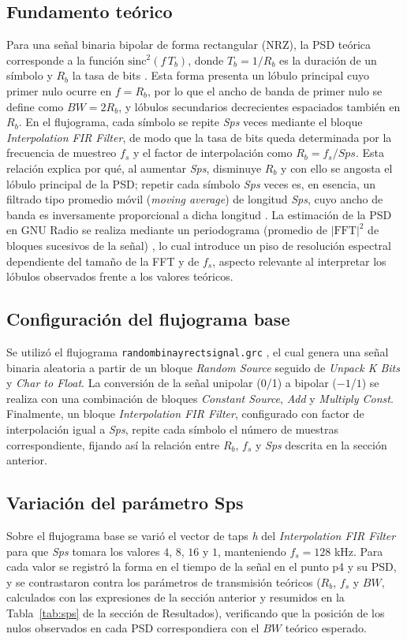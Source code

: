 \documentclass[twocolumn]{IEEEtran}
\begin{document}
\subsection{Fundamento teórico}
Para una señal binaria bipolar de forma rectangular (NRZ), la PSD teórica corresponde a la función $\text{sinc}^2(f \, T_b)$, donde $T_b = 1/R_b$ es la duración de un símbolo y $R_b$ la tasa de bits \cite{ortega2019comunicaciones}. Esta forma presenta un lóbulo principal cuyo primer nulo ocurre en $f = R_b$, por lo que el ancho de banda de primer nulo se define como $BW = 2R_b$, y lóbulos secundarios decrecientes espaciados también en $R_b$. En el flujograma, cada símbolo se repite \emph{Sps} veces mediante el bloque \emph{Interpolation FIR Filter}, de modo que la tasa de bits queda determinada por la frecuencia de muestreo $f_s$ y el factor de interpolación como $R_b = f_s / Sps$. Esta relación explica por qué, al aumentar \emph{Sps}, disminuye $R_b$ y con ello se angosta el lóbulo principal de la PSD; repetir cada símbolo \emph{Sps} veces es, en esencia, un filtrado tipo promedio móvil (\emph{moving average}) de longitud \emph{Sps}, cuyo ancho de banda es inversamente proporcional a dicha longitud \cite{wavewalkerdsp2022ma}. La estimación de la PSD en GNU Radio se realiza mediante un periodograma (promedio de $|\text{FFT}|^2$ de bloques sucesivos de la señal) \cite{tijaro2025timeaverages}, lo cual introduce un piso de resolución espectral dependiente del tamaño de la FFT y de $f_s$, aspecto relevante al interpretar los lóbulos observados frente a los valores teóricos.

\subsection{Configuración del flujograma base}
Se utilizó el flujograma \texttt{randombinayrectsignal.grc} \cite{ortega2021grc}, el cual genera una señal binaria aleatoria a partir de un bloque \emph{Random Source} seguido de \emph{Unpack K Bits} y \emph{Char to Float}. La conversión de la señal unipolar (0/1) a bipolar ($-1$/$1$) se realiza con una combinación de bloques \emph{Constant Source}, \emph{Add} y \emph{Multiply Const}. Finalmente, un bloque \emph{Interpolation FIR Filter}, configurado con factor de interpolación igual a \emph{Sps}, repite cada símbolo el número de muestras correspondiente, fijando así la relación entre $R_b$, $f_s$ y \emph{Sps} descrita en la sección anterior.

\subsection{Variación del parámetro Sps}
Sobre el flujograma base se varió el vector de taps \emph{h} del \emph{Interpolation FIR Filter} para que \emph{Sps} tomara los valores $4$, $8$, $16$ y $1$, manteniendo $f_s = 128$ kHz. Para cada valor se registró la forma en el tiempo de la señal en el punto p4 y su PSD, y se contrastaron contra los parámetros de transmisión teóricos ($R_b$, $f_s$ y $BW$, calculados con las expresiones de la sección anterior y resumidos en la Tabla~\ref{tab:sps} de la sección de Resultados), verificando que la posición de los nulos observados en cada PSD correspondiera con el $BW$ teórico esperado.
\end{document}
